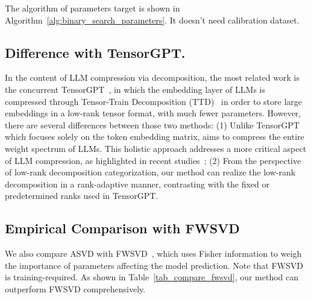 The algorithm of parameters target is shown in Algorithm~\ref{alg:binary_search_parameters}.
It doesn't need calibration dataset.


\subsection{Difference with TensorGPT.} 

In the content of LLM compression via decomposition,
the most related work is the concurrent TensorGPT~\cite{xu2023tensorgpt,zhu2023survey},
in which the embedding layer of LLMs is compressed through Tensor-Train Decomposition (TTD)~\cite{oseledets2011tensor} in order to store large embeddings in a low-rank tensor format,
with much fewer parameters. 
However, there are several differences between those two methods: 
(1) Unlike TensorGPT which focuses solely on the token embedding matrix, \asvd aims to compress the entire weight spectrum of LLMs. This holistic approach addresses a more critical aspect of LLM compression, as highlighted in recent studies~\cite{lin2023awq,kim2023squeezellm}; 
(2) From the perspective of low-rank decomposition categorization, our method can realize the low-rank decomposition in a rank-adaptive manner, contrasting with the fixed or predetermined ranks used in TensorGPT. 

\subsection{Empirical Comparison with FWSVD}
We also compare ASVD with FWSVD~\cite{hsu2022language}, which uses Fisher information to weigh the importance of parameters affecting the model prediction. Note that FWSVD is training-required. 
As shown in Table~\ref{tab_compare_fwsvd}, our method can outperform FWSVD comprehensively. 

